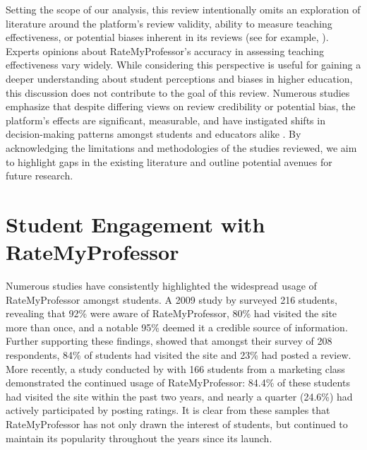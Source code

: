 \documentclass[twocolumn, doc,12pt]{apa7}
\begin{document}
Setting the scope of our analysis, this review intentionally omits an exploration of literature around the platform's review validity, ability to measure teaching effectiveness, or potential biases inherent in its reviews (see for example, \textcite{reid_role_2010,hartman_what_2013, azab_analysing_2016, boring_gender_2017, rosen_correlations_2018, baker_quantcrit_2019, gordon_role_2021}). Experts opinions about RateMyProfessor’s accuracy in assessing teaching effectiveness vary widely. While considering this perspective is useful for gaining a deeper understanding about student perceptions and biases in higher education, this discussion does not contribute to the goal of this review.  Numerous studies emphasize that despite differing views on review credibility or potential bias, the platform's effects are significant, measurable, and have instigated shifts in decision-making patterns amongst students and educators alike \textcite{johnson_i_2014, boswell_ratemyprofessors_2016, boswell_effects_2020}. By acknowledging the limitations and methodologies of the studies reviewed, we aim to highlight gaps in the existing literature and outline potential avenues for future research.

\section{Student Engagement with RateMyProfessor}
Numerous studies have consistently highlighted the widespread usage of RateMyProfessor amongst students. A 2009 study by \textcite{davison_how_2009} surveyed 216 students, revealing that 92\% were aware of RateMyProfessor, 80\% had visited the site more than once, and a notable 95\% deemed it a credible source of information. Further supporting these findings, \textcite{bleske-rechek_ratemyprofessors_2010} showed that amongst their survey of 208 respondents, 84\% of students had visited the site and 23\% had posted a review. More recently, a study conducted by \textcite{chiang_students_2017} with 166 students from a marketing class demonstrated the continued usage of RateMyProfessor: 84.4\% of these students had visited the site within the past two years, and nearly a quarter (24.6\%) had actively participated by posting ratings. It is clear from these samples that RateMyProfessor has not only drawn the interest of students, but continued to maintain its popularity throughout the years since its launch.
\end{document}
